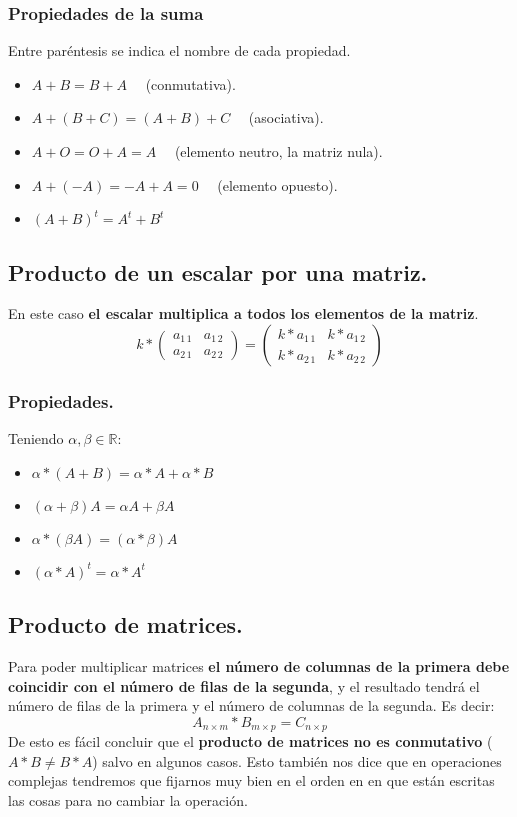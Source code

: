 \documentclass[a4paper,11pt,answers]{exam}
\begin{document}
\subsubsection{Propiedades de la suma}
Entre paréntesis se indica el nombre de cada propiedad.
\begin{itemize}
	\item $A+B = B+ A\quad$ (conmutativa).
	\item $A + (B+C) = (A+B) + C\quad$ (asociativa).
	\item $A+ O = O + A = A\quad$ (elemento neutro, la matriz nula).
	\item $A+ (-A) = -A + A = 0\quad$ (elemento opuesto).
	\item $(A+B)^t = A^t + B^t$
\end{itemize}
\subsection{Producto de un escalar por una matriz.}
En este caso \textbf{el escalar multiplica a todos los elementos de la matriz}.
\[k*\left(\begin{array}{rr}
	a_{1\,1}&a_{1\,2}\\
	a_{2\,1}&a_{2\,2}
\end{array}\right) = 
\left(\begin{array}{rr}
	k*a_{1\,1}&k*a_{1\,2}\\
	k*a_{2\,1}&k*a_{2\,2}
\end{array}\right)
\]

\subsubsection{Propiedades.}
Teniendo $\alpha, \beta \in \mathbb{R}$:
\begin{itemize}
	\item $\alpha * (A + B) = \alpha*A + \alpha*B$
	\item $(\alpha + \beta)A = \alpha A + \beta A$
	\item $\alpha*(\beta A)  = (\alpha *\beta) A$
	\item $(\alpha*A)^t = \alpha *A^t$
\end{itemize}
\subsection{Producto de matrices.}
Para poder multiplicar matrices \textbf{el número de columnas de la primera debe coincidir con el número de filas de la segunda}, y el resultado tendrá el número de filas de la primera y el número de columnas de la segunda. Es decir:
\[A_{n \times m} * B_{m\times p} = C_{n \times p}\]
De esto es fácil concluir que el \textbf{producto de matrices no es conmutativo} ($A*B \neq B*A$) salvo en algunos casos. Esto también nos dice que en operaciones complejas tendremos que fijarnos muy bien en el orden en en que están escritas las cosas para no cambiar la operación.\\
\end{document}
